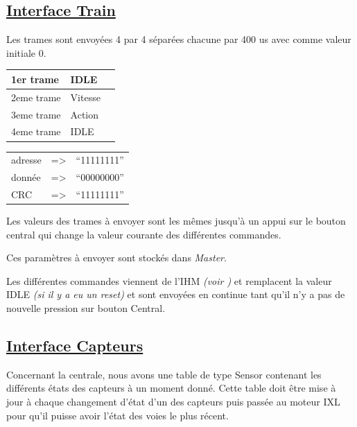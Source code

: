 \subsection{\underline{Interface Train}}
\label{sec:int_train}

\bigskip
Les trames sont envoyées 4 par 4 séparées chacune par 400 us avec comme valeur initiale 0.
\begin{center}
\begin{tabular}{|l|l|l|}
  \hline
  1er trame & IDLE \\
  \hline
  2eme trame & Vitesse \\
  \hline
  3eme trame & Action \\
  \hline
  4eme trame & IDLE \\
  \hline
\end{tabular}
\end{center}

\medskip
\begin{center}
\begin{tabular}{lll}
adresse & => & ``11111111'' \\
donnée  & => & ``00000000'' \\
CRC     & => & ``11111111'' \\
\end{tabular}
\end{center}

\medskip
Les valeurs des trames à envoyer sont les mêmes jusqu'à un appui sur
le bouton central qui change la valeur courante des différentes
commandes.

Ces paramètres à envoyer sont stockés dans \emph{Master}.

\medskip

Les différentes commandes viennent de l'IHM \emph{(voir
  \cite{rapport})}  et remplacent la valeur IDLE \emph{(si il y a eu
  un reset)} et sont envoyées en continue tant qu'il n'y a pas de nouvelle pression sur bouton Central.


\subsection{\underline{Interface Capteurs}}
\label{sec:int_cap}

Concernant la centrale, nous avons  une table de type Sensor
contenant les différents états des capteurs à un moment donné. Cette
table doit être mise à jour à chaque changement d'état d'un des
capteurs puis passée au moteur IXL pour qu'il puisse avoir l'état des
voies le plus récent. 


